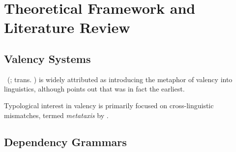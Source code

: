 \section{Theoretical Framework and Literature Review}
\subsection{Valency Systems}
\citeauthor{tesniere1959}~(\cite*{tesniere1959}; trans. \cite*{tesniere2015}) is widely attributed as introducing the metaphor of valency into linguistics, although \citet{przepiorkowski2018} points out that \citet{peirce1897} was in fact the earliest.

Typological interest in valency is primarily focused on cross-linguistic mismatches, termed \textit{metataxis} by \citet{tesniere1959}.

\subsection{Dependency Grammars}

